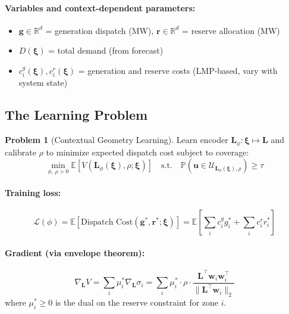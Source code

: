 \documentclass[11pt]{article}
\newcommand{\R}{\mathbb{R}}
\newcommand{\E}{\mathbb{E}}
\newcommand{\Prob}{\mathbb{P}}
\newcommand{\cU}{\mathcal{U}}
\newcommand{\bxi}{\bm{\xi}}
\newcommand{\bu}{\bm{u}}
\newcommand{\bw}{\bm{w}}
\newcommand{\bL}{\bm{L}}
\newcommand{\bg}{\bm{g}}
\newcommand{\br}{\bm{r}}
\theoremstyle{definition}
\newtheorem{problem}{Problem}
\begin{document}
\paragraph{Variables and context-dependent parameters:}
\begin{itemize}[leftmargin=2em, itemsep=2pt]
\item $\bg \in \R^d$ = generation dispatch (MW), $\br \in \R^d$ = reserve allocation (MW)
\item $D(\bxi)$ = total demand (from forecast)
\item $c_i^g(\bxi), c_i^r(\bxi)$ = generation and reserve costs (LMP-based, vary with system state)
\end{itemize}



\subsection{The Learning Problem}

\begin{problem}[Contextual Geometry Learning]
Learn encoder $\bL_\phi : \bxi \mapsto \bL$ and calibrate $\rho$ to minimize expected dispatch cost subject to coverage:
\begin{equation}\label{eq:learning}
\boxed{
\min_{\phi,\, \rho > 0} \E\left[V(\bL_\phi(\bxi), \rho; \bxi)\right] \quad \text{s.t.} \quad \Prob(\bu \in \cU_{\bL_\phi(\bxi),\rho}) \ge \tau
}
\end{equation}
\end{problem}

\paragraph{Training loss:}
\begin{equation}
\mathcal{L}(\phi) = \E\left[\text{Dispatch Cost}(\bg^*, \br^*; \bxi)\right] = \E\left[\sum_i c_i^g g_i^* + \sum_i c_i^r r_i^*\right]
\end{equation}

\paragraph{Gradient (via envelope theorem):}
\begin{equation}
\nabla_{\bL} V = \sum_i \mu_i^* \nabla_{\bL} \sigma_i = \sum_i \mu_i^* \cdot \rho \cdot \frac{\bL^\top \bw_i \bw_i^\top}{\|\bL^\top \bw_i\|_2}
\end{equation}
where $\mu_i^* \ge 0$ is the dual on the reserve constraint for zone $i$. 
\end{document}
